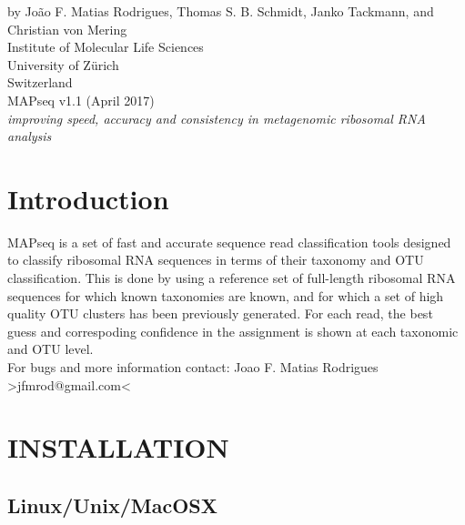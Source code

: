 \documentclass[10pt,a4paper]{article}
\begin{document}
 

\pagestyle{empty} %

{
 \raggedleft %
 \vspace*{\baselineskip} %
 {\Large by Jo\~ao F. Matias Rodrigues, Thomas S. B. Schmidt, Janko Tackmann, and Christian von Mering\\
 Institute of Molecular Life Sciences\\University of Z\"urich\\Switzerland}\\[0.167\textheight] %
 {\Huge MAPseq v1.1 (April 2017)}\\[\baselineskip] %
 {\Large \textit{improving speed, accuracy and consistency in metagenomic ribosomal RNA analysis}}\par %
}
\vfill %
\vspace*{3\baselineskip} %

\newpage

\tableofcontents
\newpage
{}

\section{Introduction}

MAPseq is a set of fast and accurate sequence read classification tools designed to classify ribosomal
RNA sequences in terms of their taxonomy and OTU classification. This is done by using a
reference set of full-length ribosomal RNA sequences for which known taxonomies are known,
and for which a set of high quality OTU clusters has been previously generated.
For each read, the best guess and correspoding confidence in the assignment is shown at
each taxonomic and OTU level.
\\
For bugs and more information contact: Joao F. Matias Rodrigues {\textgreater}jfmrod@gmail.com\textless


\section{INSTALLATION}

\subsection{Linux/Unix/MacOSX}
\end{document}
